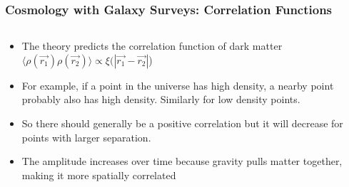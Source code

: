 \documentclass{beamer}
\begin{document}
\frame
{

    \frametitle{Cosmology with Galaxy Surveys: Correlation Functions}


    \begin{columns}
        \begin{column}{0.5\textwidth}
            \begin{itemize}

                \item The theory predicts the correlation function of
                    dark matter 
                    {\color{gold} $\langle \rho(\vec{r_1}) \rho(\vec{r_2})
                    \rangle \propto \xi(|\vec{r_1} - \vec{r_2}|$) }

                \item For example, if a point in the universe has high density, a nearby
                    point probably also has high density. Similarly
                    for low density points.
                    
                \item So there should generally
                    be a positive correlation but it will decrease
                    for  points with larger separation.
                    
                \item The amplitude increases over time because gravity pulls
                    matter together, making it more spatially correlated


            \end{itemize}


\end{column}
\end{columns}}
\end{document}
